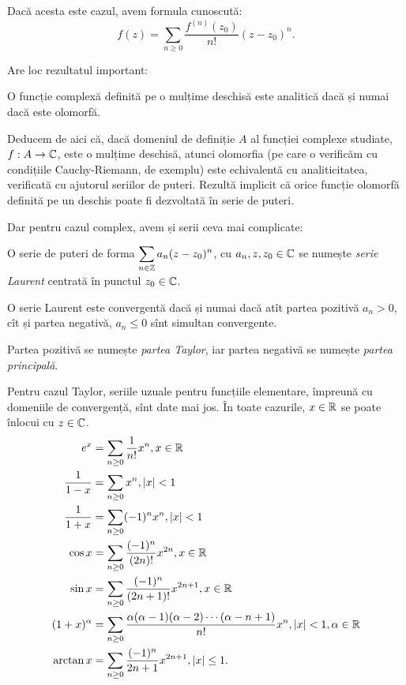 Dacă acesta este cazul, avem formula cunoscută:
\[
  f(z) = \sum_{n \geq 0} \dfrac{f^{(n)}(z_0)}{n!} (z - z_0)^n.
\]

Are loc rezultatul important:
\begin{theorem}\label{thm:wrc}
  O funcție complexă definită pe o mulțime deschisă este analitică dacă și
  numai dacă este olomorfă.
\end{theorem}

Deducem de aici că, dacă domeniul de definiție $ A $ al funcției complexe
studiate, $ f : A \to \mathbb{C} $, este o mulțime deschisă, atunci olomorfia
(pe care o verificăm cu condițiile Cauchy-Riemann, de exemplu) este echivalentă
cu analiticitatea, verificată cu ajutorul seriilor de puteri. Rezultă
implicit că orice funcție olomorfă definită pe un deschis poate fi dezvoltată
în serie de puteri.

Dar pentru cazul complex, avem și serii ceva mai complicate:
\begin{definition}\label{def:laurent}
  O serie de puteri de forma $ \displaystyle\sum_{n \in \mathbb{Z}} a_n(z - z_0)^n $,
  cu $ a_n, z, z_0 \in \mathbb{C} $ se numește \emph{serie Laurent} centrată în
  punctul $ z_0 \in \mathbb{C} $.
\end{definition}

O serie Laurent este convergentă dacă și numai dacă atît partea pozitivă
$ a_n > 0 $, cît și partea negativă, $ a_n \leq 0 $ sînt simultan convergente.

Partea pozitivă se numește \emph{partea Taylor}, iar partea negativă se numește
\emph{partea principală}.

Pentru cazul Taylor, seriile uzuale pentru funcțiile elementare, împreună cu domeniile
de convergență, sînt date mai jos. În toate cazurile, $ x \in \mathbb{R} $ se poate înlocui
cu $ z \in \mathbb{C} $.
\begin{align*}
  e^x &= \sum_{n \geq 0} \dfrac{1}{n!} x^n, x \in \RR \\
  \dfrac{1}{1 - x} &= \sum_{n \geq 0} x^n, |x| < 1 \\
  \dfrac{1}{1 + x} &= \sum_{n \geq 0} (-1)^n x^n, |x| < 1 \\
  \cos x &= \sum_{n \geq 0} \dfrac{(-1)^n}{(2n)!} x^{2n}, x \in \RR \\
  \sin x &= \sum_{n \geq 0} \dfrac{(-1)^n}{(2n + 1)!} x^{2n + 1}, x \in \RR \\
  (1 + x)^\alpha &= \sum_{n \geq 0} \dfrac{\alpha(\alpha - 1)(\alpha - 2) \cdots (\alpha - n + 1)}{n!} x^n,%
                   |x| < 1, \alpha \in \RR \\
  \arctan x &= \sum_{n \geq 0} \dfrac{(-1)^n}{2n + 1} x^{2n + 1}, | x | \leq 1.
\end{align*}

